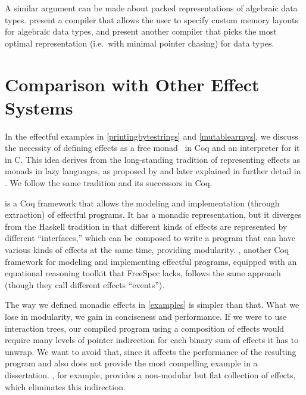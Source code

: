 A similar argument can be made about packed representations of algebraic data types.  present a compiler that allows the user to specify custom memory layouts for algebraic data types, and  present another compiler that picks the most optimal representation (i.e.\ with minimal pointer chasing) for data types.


\section{Comparison with Other Effect Systems}

In the effectful examples in \autoref{printingbytestrings} and \autoref{mutablearrays}, we discuss the necessity of defining effects as a free monad~\cite{swierstra2008data} in Coq and an interpreter for it in C. This idea derives from the long-standing tradition of representing effects as monads in lazy languages, as proposed by  and later explained in further detail in . We follow the same tradition and its successors in Coq.

 is a Coq framework that allows the modeling and implementation (through extraction) of effectful programs. It has a monadic representation, but it diverges from the Haskell tradition in that different kinds of effects are represented by different ``interfaces,'' which can be composed to write a program that can have various kinds of effects at the same time, providing modularity. , another Coq framework for modeling and implementing effectful programs, equipped with an equational reasoning toolkit that FreeSpec lacks, follows the same approach (though they call different effects ``events'').

The way we defined monadic effects in \autoref{examples} is simpler than that. What we lose in modularity, we gain in conciseness and performance. If we were to use interaction trees, our compiled program using a composition of effects would require many levels of pointer indirection for each binary sum of effects it has to unwrap. We want to avoid that, since it affects the performance of the resulting program and also does not provide the most compelling example in a dissertation. , for example, provides a non-modular but flat collection of effects, which eliminates this indirection.

